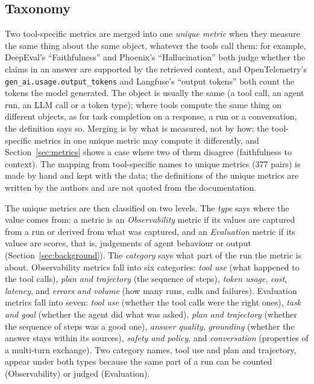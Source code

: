 \documentclass[conference]{IEEEtran}
\begin{document}
\subsection{Taxonomy}\label{sec:taxonomy}
Two tool-specific metrics are merged into one \emph{unique metric} when they measure the same thing about the same object, whatever the tools call them: for example, DeepEval's ``Faithfulness'' and Phoenix's ``Hallucination'' both judge whether the claims in an answer are supported by the retrieved context, and OpenTelemetry's \texttt{gen\_ai.usage.output\_tokens} and Langfuse's ``output tokens'' both count the tokens the model generated. The object is usually the same (a tool call, an agent run, an LLM call or a token type); where tools compute the same thing on different objects, as for task completion on a response, a run or a conversation, the definition says so. Merging is by what is measured, not by how: the tool-specific metrics in one unique metric may compute it differently, and Section~\ref{sec:metrics} shows a case where two of them disagree (faithfulness to context). The mapping from tool-specific names to unique metrics (377 pairs) is made by hand and kept with the data; the definitions of the unique metrics are written by the authors and are not quoted from the documentation.

The unique metrics are then classified on two levels. The \emph{type} says where the value comes from: a metric is an \emph{Observability} metric if its values are captured from a run or derived from what was captured, and an \emph{Evaluation} metric if its values are scores, that is, judgements of agent behaviour or output (Section~\ref{sec:background}). The \emph{category} says what part of the run the metric is about. Observability metrics fall into six categories: \emph{tool use} (what happened to the tool calls), \emph{plan and trajectory} (the sequence of steps), \emph{token usage}, \emph{cost}, \emph{latency}, and \emph{errors and volume} (how many runs, calls and failures). Evaluation metrics fall into seven: \emph{tool use} (whether the tool calls were the right ones), \emph{task and goal} (whether the agent did what was asked), \emph{plan and trajectory} (whether the sequence of steps was a good one), \emph{answer quality}, \emph{grounding} (whether the answer stays within its sources), \emph{safety and policy}, and \emph{conversation} (properties of a multi-turn exchange). Two category names, tool use and plan and trajectory, appear under both types because the same part of a run can be counted (Observability) or judged (Evaluation).
\end{document}
